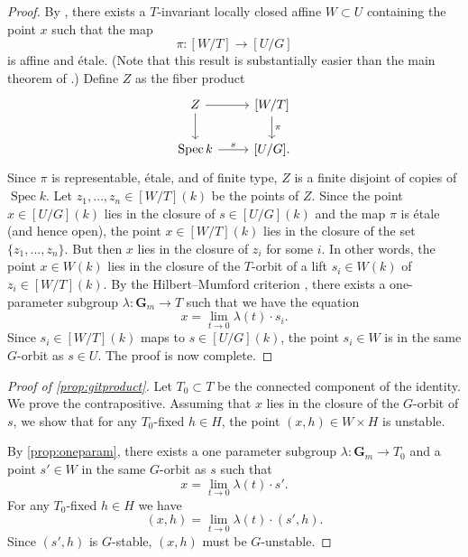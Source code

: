 \documentclass[reqno]{amsart}
\renewcommand{\k}{k}
\renewcommand{\to}{{\longrightarrow}}
\providecommand{\spec}{\operatorname{Spec}}
\numberwithin{equation}{section}
\newcommand{\G}{\mathbf{G}}
\begin{document}
\begin{proof}
  By \cite[Theorem~3]{alp:10}, there exists a $T$-invariant locally closed affine $W \subset U$ containing the point $x$ such that the map
  \[ \pi \colon [W/T] \to [U / G]\]
  is affine and \'etale.
  (Note that this result is substantially easier than the main theorem of \cite{alp.hal.ryd:20}.)
  Define $Z$ as the fiber product
  \[
    \begin{tikzcd}
      Z \ar{r}\ar{d}& {[W/T]}\ar{d}{\pi}\\
      \spec \k \ar{r}{s}& {[U/G]}.
    \end{tikzcd}
  \]
  Since $\pi$ is representable, \'etale, and of finite type, $Z$ is a finite disjoint of copies of $\spec \k$.
  Let $z_1, \dots, z_n \in [W/T](\k)$ be the points of $Z$.
  Since the point $x \in [U/G](\k)$ lies in the closure of $s \in [U/G](\k)$ and the map $\pi$ is \'etale (and hence open), the point $x \in [W/T](\k)$ lies in the closure of the set $\{z_1,\dots, z_n\}$.
  But then $x$ lies in the closure of $z_i$ for some $i$.
  In other words, the point $x \in W(\k)$ lies in the closure of the $T$-orbit of a lift $s_i \in W(\k)$ of $z_i \in [W/T](\k)$.
  By the Hilbert--Mumford criterion \cite[Theorem~1.4]{kem:78}, there exists a one-parameter subgroup $\lambda \colon \G_m \to T$ such that we have the equation
  \begin{equation}\label{eqn:specialization}
    x = \lim_{t \to 0} \lambda (t) \cdot s_i.
  \end{equation}
  Since $s_i \in [W/T](\k)$ maps to $s \in [U/G](\k)$, the point $s_i \in W$ is in the same $G$-orbit as $s \in U$.
  The proof is now complete.
\end{proof}

\begin{proof}[Proof of \autoref{prop:gitproduct}]
  Let $T_0 \subset T$ be the connected  component of the identity.
  We prove the contrapositive.
  Assuming that $x$ lies in the closure of the $G$-orbit of $s$, we show that for any $T_0$-fixed $h \in H$, the point $(x, h) \in W \times H$ is unstable.

  By \autoref{prop:oneparam}, there exists a one parameter subgroup $\lambda \colon \G_m \to T_0$ and a point $s' \in W$ in the same $G$-orbit as $s$ such that
  \[ x = \lim_{t \to 0} \lambda(t) \cdot s'.\]
  For any $T_0$-fixed $h \in H$ we have
  \[
    (x, h) = \lim_{t \to 0} \lambda(t) \cdot (s', h).
  \]
  Since $(s',h)$ is $G$-stable, $(x,h)$ must be $G$-unstable.
\end{proof}
\end{document}
